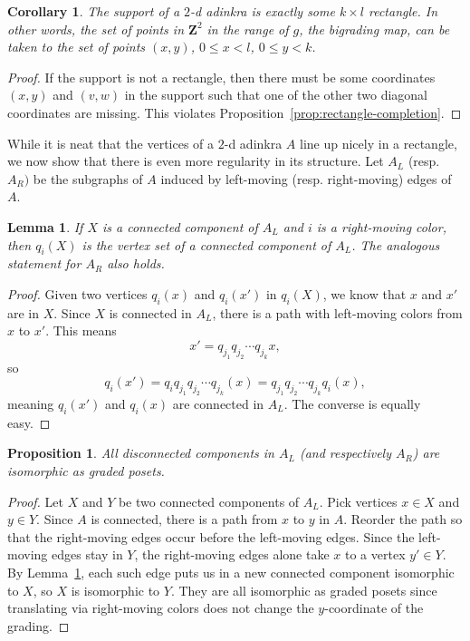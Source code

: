 \documentclass[12pt,twoside,singlespace]{article}
\numberwithin{equation}{section}
\newtheorem{lem}[equation]{Lemma}
\newtheorem{cor}[equation]{Corollary}
\newtheorem{prop}[equation]{Proposition}
\theoremstyle{definition}
\newcommand{\ZZ}{\mathbf{Z}}
\begin{document}
\begin{cor}
\label{cor:rectangle}
The support of a $2$-d adinkra is exactly some $k \times l$ rectangle. In other words, the set of points in $\ZZ^2$ in the range of $g$, the bigrading map, can be taken to the set of points $(x,y)$, $0 \leq x < l$, $0 \leq y < k$.
\end{cor}
\begin{proof}
If the support is not a rectangle, then there must be some coordinates $(x,y)$ and $(v,w)$ in the support such that one of the other two diagonal coordinates are missing. This violates Proposition~\ref{prop:rectangle-completion}.
\end{proof}

While it is neat that the vertices of a $2$-d adinkra $A$ line up nicely in a rectangle, we now show that there is even more regularity in its structure. Let $A_L$ (resp. $A_R)$ be the subgraphs of $A$ induced by left-moving (resp. right-moving) edges of $A$. %

\begin{lem}
\label{lem:kevin-translate-component}
If $X$ is a connected component of $A_L$ and $i$ is a right-moving color, then $q_i(X)$ is the vertex set of a connected component of $A_L$. The analogous statement for $A_R$ also holds.
\end{lem}
\begin{proof}
Given two vertices $q_i(x)$ and $q_i(x')$ in $q_i(X)$, we know that $x$ and $x'$ are in $X$. Since $X$ is connected in $A_L$, there is a path with left-moving colors from $x$ to $x'$. This means 
\[
x' = q_{j_1}q_{j_2}\cdots q_{j_k} x,
\]
so
\[
q_i (x') = q_i q_{j_1} q_{j_2} \cdots q_{j_k} (x) = q_{j_1} q_{j_2} \cdots q_{j_k} q_i (x),
\]
meaning $q_i(x')$ and $q_i(x)$ are connected in $A_L$. The converse is equally easy.
\end{proof}

\begin{prop}
\label{prop:kevin}
All disconnected components in $A_L$ (and respectively $A_R$) are isomorphic as graded posets.
\end{prop}
\begin{proof}
Let $X$ and $Y$ be two connected components of $A_L$. Pick vertices $x \in X$ and $y \in Y$. Since $A$ is connected, there is a path from $x$ to $y$ in $A$. Reorder the path so that the right-moving edges occur before the left-moving edges. Since the left-moving edges stay in $Y$, the right-moving edges alone take $x$ to a vertex $y' \in Y$. By Lemma~\ref{lem:kevin-translate-component}, each such edge puts us in a new connected component isomorphic to $X$, so $X$ is isomorphic to $Y$. They are all isomorphic as graded posets since translating via right-moving colors does not change the $y$-coordinate of the grading.
\end{proof}
\end{document}
